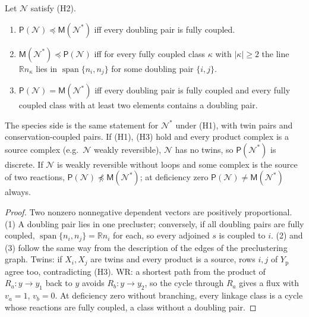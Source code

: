 \documentclass[11pt,a4paper]{report}
\newcommand{\Net}{\mathcal{N}}
\newcommand{\Nd}{\mathcal{N}^{*}}
\newcommand{\Yp}{Y_{\mathrm p}}
\newcommand{\spn}{\operatorname{span}}
\newcommand{\Pre}{\mathsf{P}}
\newcommand{\Mips}{\mathsf{M}}
\newcommand{\refi}{\preceq}
\newcommand{\nrefi}{\not\preceq}
\begin{document}
\begin{theorem}\label{thm:criteria}
Let \(\Net\) satisfy (H2).
\begin{enumerate}
\item \(\Pre(\Net)\refi\Mips(\Nd)\) iff every doubling pair is fully coupled.
\item \(\Mips(\Nd)\refi\Pre(\Net)\) iff for every fully coupled class \(\kappa\) with \(|\kappa|\ge2\) the line
\(\mathbb{R}n_\kappa\) lies in \(\spn\{n_i,n_j\}\) for some doubling pair \(\{i,j\}\).
\item \(\Pre(\Net)=\Mips(\Nd)\) iff every doubling pair is fully coupled and every fully coupled class with at least
two elements contains a doubling pair.
\end{enumerate}
The species side is the same statement for \(\Nd\) under (H1), with twin pairs and conservation-coupled pairs. If
(H1), (H3) hold and every product complex is a source complex (e.g.\ \(\Net\) weakly reversible), \(\Net\) has no
twins, so \(\Pre(\Nd)\) is discrete. If \(\Net\) is weakly reversible without loops and some complex is the source of
two reactions, \(\Pre(\Net)\nrefi\Mips(\Nd)\); at deficiency zero \(\Pre(\Net)\neq\Mips(\Nd)\) always.
\end{theorem}
\begin{proof}
Two nonzero nonnegative dependent vectors are positively proportional. (1) A doubling pair lies in one precluster;
conversely, if all doubling pairs are fully coupled, \(\spn\{n_i,n_j\}=\mathbb{R}n_i\) for each, so every adjoined
\(s\) is coupled to \(i\). (2) and (3) follow the same way from the description of the edges of the preclustering
graph. Twins: if \(X_i,X_j\) are twins and every product is a source, rows \(i,j\) of \(\Yp\) agree too, contradicting
(H3). WR: a shortest path from the product of \(R_a\colon y\to y_1\) back to \(y\) avoids \(R_b\colon y\to y_2\), so
the cycle through \(R_a\) gives a flux with \(v_a=1\), \(v_b=0\). At deficiency zero without branching, every linkage
class is a cycle whose reactions are fully coupled, a class without a doubling pair.
\end{proof}
\end{document}

